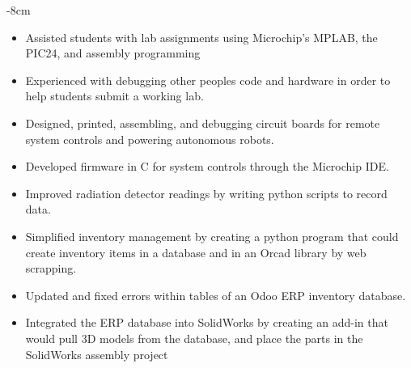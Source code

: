 \documentclass[10pt,a4paper]{altacv}
\begin{document}

\begin{adjustwidth}{}{-8cm}
\makecvheader
\end{adjustwidth}




\begin{itemize}
\item Assisted students with lab assignments using Microchip’s MPLAB, the PIC24, and assembly programming 
\item Experienced with debugging other peoples code and hardware in order to help students submit a working lab. 
\end{itemize}

\divider

\begin{itemize}
\item Designed, printed, assembling, and debugging circuit boards for remote system controls and powering autonomous robots.  
\item Developed firmware in C for system controls through the Microchip IDE. 
\item Improved radiation detector readings by writing python scripts to record data. 
\end{itemize}
\divider

\begin{itemize}
\item Simplified inventory management by creating a python program that could create inventory items in a database and in an Orcad library by web scrapping. 
\item Updated and fixed errors within tables of an Odoo ERP inventory database. 
\item Integrated the ERP database into SolidWorks by creating an add-in that would pull 3D models from the database, and place the parts in the SolidWorks assembly project

\end{itemize}
\end{document}
